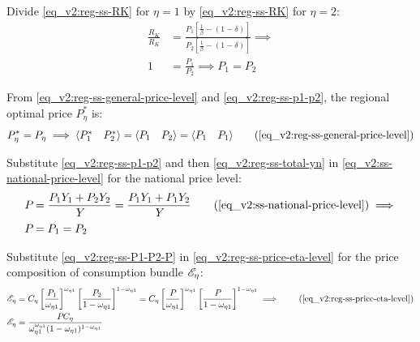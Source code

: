 \documentclass[../thesis.tex]{subfiles}
\begin{document}
	Divide \ref{eq_v2:reg-ss-RK} for $\eta = 1$ by \ref{eq_v2:reg-ss-RK} for $\eta = 2$:
	\begin{align}
		\frac{R_K}{R_K} &= \frac{P_{1} \left[ \frac{1}{\beta} - (1-\delta) \right]}{P_{2} \left[ \frac{1}{\beta} - (1-\delta) \right]} \implies \nonumber \\
		1 &= \frac{P_{1}}{P_{2}} \implies P_{1} = P_{2} \label{eq_v2:reg-ss-p1-p2}
	\end{align}

From \ref{eq_v2:reg-ss-general-price-level} and \ref{eq_v2:reg-ss-p1-p2}, the regional optimal price $P_{\eta}^{\ast}$ is:
\begin{align}
	P_{\eta}^{\ast} = P_{\eta} \implies \langle \begin{matrix} P_{1}^{\ast} & P_{2}^{\ast} \end{matrix} \rangle = \langle \begin{matrix} P_{1} & P_{2} \end{matrix} \rangle = \langle \begin{matrix} P_{1} & P_{1} \end{matrix} \rangle \tag{\ref{eq_v2:reg-ss-general-price-level}}
\end{align}

Substitute \ref{eq_v2:reg-ss-p1-p2} and then \ref{eq_v2:reg-ss-total-yn} in \ref{eq_v2:ss-national-price-level} for the national price level:
	\begin{align}
		P_{} &= \frac{P_{1} Y_{1} + P_{2} Y_{2}}{Y_{}} = \frac{P_{1} Y_{1} + P_{1} Y_{2}}{Y_{}} \tag{\ref{eq_v2:ss-national-price-level}} \implies \nonumber \\
		P_{} &= P_{1} = P_{2} \label{eq_v2:reg-ss-P1-P2-P}
	\end{align}

Substitute \ref{eq_v2:reg-ss-P1-P2-P} in \ref{eq_v2:reg-ss-price-eta-level} for the price composition of consumption bundle $\te[]$:
\begin{align}
	\te[] &= C_{\eta} \left[ \frac{P_{1}}{\omega_{\eta 1}} \right]^{\omega_{\eta 1}} \left[ \frac{P_{2}}{1 -\omega_{\eta 1}} \right]^{1 -\omega_{\eta 1}} = C_{\eta} \left[ \frac{P_{}}{\omega_{\eta 1}} \right]^{\omega_{\eta 1}} \left[ \frac{P_{}}{1 -\omega_{\eta 1}} \right]^{1 -\omega_{\eta 1}} \implies \tag{\ref{eq_v2:reg-ss-price-eta-level}} \\
	\te[] &= \frac{P_{} C_{\eta}}{\omega_{\eta 1}^{\omega_{\eta 1}} (1 -\omega_{\eta 1})^{1 -\omega_{\eta 1}}} \label{eq_v2:reg-ss-te}
\end{align}
\end{document}
